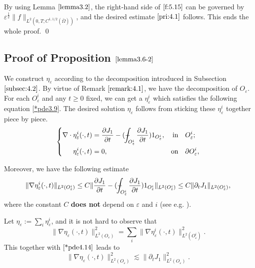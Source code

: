 \documentclass[13pt,CJK]{article}
\theoremstyle{plain}                       %
\theoremstyle{remark}
\numberwithin{equation}{section}
\def\Xint#1{\mathchoice
  {\XXint\displaystyle\textstyle{#1}}%
  {\XXint\textstyle\scriptstyle{#1}}%
  {\XXint\scriptstyle\scriptscriptstyle{#1}}%
  {\XXint\scriptscriptstyle\scriptscriptstyle{#1}}%
  \!\int}
\def\XXint#1#2#3{{\setbox0=\hbox{$#1{#2#3}{\int}$}
  \vcenter{\hbox{$#2#3$}}\kern-.5\wd0}}
\def\dashint{\Xint-}
\begin{document}
By using  Lemma $\ref{lemma3.2}$, the right-hand side of
$\eqref{f:5.15}$
can be governed by $\varepsilon^{\frac{1}{2}}\|f\|_{L^2(0,T;C^{1,1/2}(\bar{\Omega}))}$,
and the desired estimate $\eqref{pri:4.1}$ follows. This ends the whole proof.
\qed









\subsection{\centering Proof of Proposition $\ref{lemma3.6-2}$}\label{subsec:4.4}


\noindent
We construct $\eta_{\varepsilon}$ according to the decomposition
introduced in Subsection $\ref{subsec:4.2}$. By virtue of
Remark $\ref{remark:4.1}$, we have the decomposition of $O_\varepsilon$. For each $O_\varepsilon^i$ and any $t\geq 0$ fixed,
we can get a $\eta_{\varepsilon}^{i}$ which satisfies the following equation \eqref{*pde3.9}. The desired solution $\eta_{\varepsilon}$ follows from sticking these $\eta_{\varepsilon}^{i}$ together piece by piece.
\begin{equation}\label{*pde3.9}
\left\{
\begin{aligned}
  \nabla\cdot\eta_{\varepsilon}^{i}(\cdot,t) &=\frac{\partial J_1}{\partial t}
  -(\dashint_{O_{\varepsilon}^i}\frac{\partial J_1}{\partial t})1_{O_{\varepsilon}^i},&\text{in}&\quad O_{\varepsilon}^i;\\
  \eta_{\varepsilon}^{i}(\cdot,t)&=0,&\text{on}&\quad\partial O_{\varepsilon}^i,
\end{aligned}\right.
\end{equation}

Moreover, we have the following estimate
\begin{equation}\label{*pde4.14}
\|\nabla\eta_{\varepsilon}^{i}(\cdot,t)\|_{L^2(O_{\varepsilon}^i)}\leq C \|\frac{\partial J_1}{\partial t}-(
\dashint_{O_{\varepsilon}^i}\frac{\partial J_1}{\partial t}
)1_{O_{\varepsilon}^i}\|_{L^2(O_{\varepsilon}^i)}
\leq C
\|\partial_t J_1\|_{L^2(O_{\varepsilon}^i)},
\end{equation}
where the constant $C$ \textbf{does not} depend on $\varepsilon$ and $i$ (see e.g. \cite[Chapter III.3]{Galdi11}).


Let $\eta_{\varepsilon}:=\sum_{i}\eta_{\varepsilon}^{i}$,
and it is not hard to observe that
\begin{equation*}
 \|\nabla \eta_{\varepsilon}(\cdot,t)\|_{L^2(O_\varepsilon)}^2
 = \sum_{i}\|\nabla\eta_{\varepsilon}^{i}(\cdot,t)\|_{L^2(O_\varepsilon^i)}^2.
\end{equation*}
This together with $\eqref{*pde4.14}$ leads to
\begin{equation}\label{f:5.13}
 \|\nabla \eta_{\varepsilon}(\cdot,t)\|_{L^2(O_\varepsilon)}^2
 \lesssim \|\partial_t J_1\|_{L^2(O_\varepsilon)}^2.
\end{equation}
\end{document}
